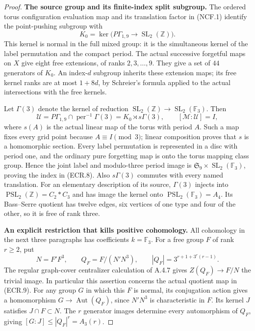 \begin{proof}
\par\medskip\noindent\textbf{The source group and its finite-index split subgroup.}\quad
The ordered torus configuration evaluation map and its translation
factor in (NCF.1) identify the point-pushing subgroup with
\[
 K_0=\ker\bigl(P\Gamma_{1,9}\longrightarrow
                              \operatorname{SL}_2(\mathbb Z)\bigr).
                                                               \tag{ECR.7}
\]
This kernel is normal in the full mixed group: it is the simultaneous
kernel of the label permutation and the compact period.  The actual
successive forgetful maps on $X$ give eight free extensions, of ranks
$2,3,\ldots,9$.  They give a set of $44$ generators of $K_0$.
An index-$d$ subgroup inherits these extension maps; its free kernel
ranks are at most $1+8d$, by Schreier's formula applied to the actual
intersections with the free kernels.

Let $\Gamma(3)$ denote the kernel of reduction
$\operatorname{SL}_2(\mathbb Z)\to\operatorname{SL}_2(\mathbb F_3)$.
Then
\[
 \mathcal U=P\Gamma_{1,9}\cap\operatorname{per}^{-1}\Gamma(3)
              =K_0\rtimes s\Gamma(3),\qquad
 [\mathcal M:\mathcal U]=I,
                                                               \tag{ECR.8}
\]
where $s(A)$ is the actual linear map of the torus with period $A$.
Such a map fixes every grid point because $A\equiv I\pmod3$;
linear composition proves that $s$ is a homomorphic section.
Every label permutation is represented in a disc with period one,
and the ordinary pure forgetting map is onto the torus mapping class
group.  Hence the joint label and modulo-three period image is
$\mathfrak S_9\times\operatorname{SL}_2(\mathbb F_3)$, proving the
index in (ECR.8).  Also $s\Gamma(3)$ commutes with every named
translation.  For an elementary description of its source,
$\Gamma(3)$ injects into
$\operatorname{PSL}_2(\mathbb Z)=C_2*C_3$ and has image the kernel
onto $\operatorname{PSL}_2(\mathbb F_3)=A_4$.
Its Bass--Serre quotient has twelve edges, six vertices of one type
and four of the other, so it is free of rank three.

\par\medskip\noindent\textbf{An explicit restriction that kills positive cohomology.}\quad
All cohomology in the next three paragraphs has coefficients
$k=\mathbb F_3$.  For a free group $F$ of rank $r\geq2$, put
\[
 N=F'F^3,\qquad Q_F=F/(N'N^3),\qquad
 |Q_F|=3^{r+1+3^r(r-1)}.
                                                               \tag{ECR.9}
\]
The regular graph-cover centralizer calculation of A.4.7 gives
$Z(Q_F)\to F/N$ the trivial image.  In particular this assertion
concerns the actual quotient map in (ECR.9).
For any group $G$ in which this $F$ is normal, its conjugation action
gives a homomorphism $G\to\operatorname{Aut}(Q_F)$, since $N'N^3$
is characteristic in $F$.  Its kernel $J$ satisfies
$J\cap F\subset N$.  The $r$ generator images determine every
automorphism of $Q_F$, giving
$[G:J]\leq |Q_F|^r=A_3(r)$.


\end{proof}
